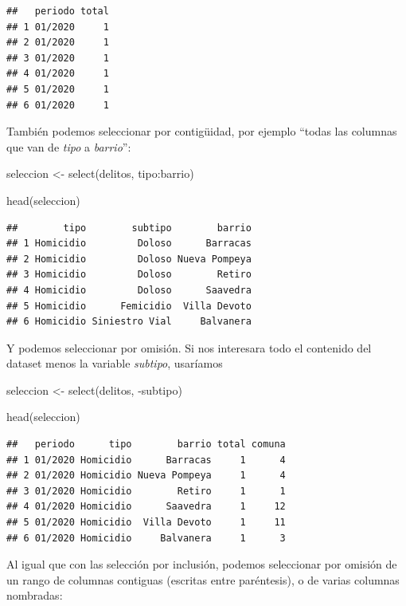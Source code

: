 \documentclass[
]{book}
\newenvironment{Shaded}{\begin{snugshade}}{\end{snugshade}}
\newcommand{\FunctionTok}[1]{\textcolor[rgb]{0.00,0.00,0.00}{#1}}
\newcommand{\NormalTok}[1]{#1}
\newcommand{\OtherTok}[1]{\textcolor[rgb]{0.56,0.35,0.01}{#1}}
\newcommand{\SpecialCharTok}[1]{\textcolor[rgb]{0.00,0.00,0.00}{#1}}
\begin{document}
\begin{verbatim}
##   periodo total
## 1 01/2020     1
## 2 01/2020     1
## 3 01/2020     1
## 4 01/2020     1
## 5 01/2020     1
## 6 01/2020     1
\end{verbatim}

También podemos seleccionar por contigüidad, por ejemplo ``todas las columnas que van de \emph{tipo} a \emph{barrio}'':

\begin{Shaded}
\begin{Highlighting}[]
\NormalTok{seleccion }\OtherTok{\textless{}{-}} \FunctionTok{select}\NormalTok{(delitos, tipo}\SpecialCharTok{:}\NormalTok{barrio)}

\FunctionTok{head}\NormalTok{(seleccion)}
\end{Highlighting}
\end{Shaded}

\begin{verbatim}
##        tipo        subtipo        barrio
## 1 Homicidio         Doloso      Barracas
## 2 Homicidio         Doloso Nueva Pompeya
## 3 Homicidio         Doloso        Retiro
## 4 Homicidio         Doloso      Saavedra
## 5 Homicidio      Femicidio  Villa Devoto
## 6 Homicidio Siniestro Vial     Balvanera
\end{verbatim}

Y podemos seleccionar por omisión. Si nos interesara todo el contenido del dataset menos la variable \emph{subtipo}, usaríamos

\begin{Shaded}
\begin{Highlighting}[]
\NormalTok{seleccion }\OtherTok{\textless{}{-}} \FunctionTok{select}\NormalTok{(delitos, }\SpecialCharTok{{-}}\NormalTok{subtipo)}

\FunctionTok{head}\NormalTok{(seleccion)}
\end{Highlighting}
\end{Shaded}

\begin{verbatim}
##   periodo      tipo        barrio total comuna
## 1 01/2020 Homicidio      Barracas     1      4
## 2 01/2020 Homicidio Nueva Pompeya     1      4
## 3 01/2020 Homicidio        Retiro     1      1
## 4 01/2020 Homicidio      Saavedra     1     12
## 5 01/2020 Homicidio  Villa Devoto     1     11
## 6 01/2020 Homicidio     Balvanera     1      3
\end{verbatim}

Al igual que con las selección por inclusión, podemos seleccionar por omisión de un rango de columnas contiguas (escritas entre paréntesis), o de varias columnas nombradas:
\end{document}

